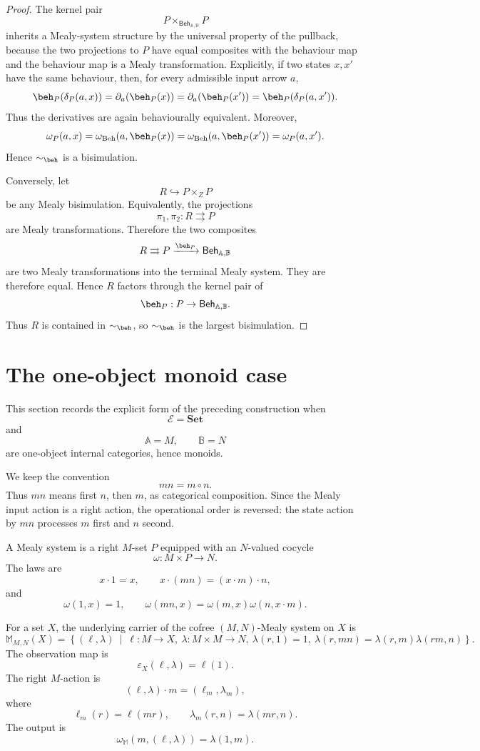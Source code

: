 \begin{proof}
The kernel pair
\[
P\times_{\mathsf{Beh}_{\mathbb A,\mathbb B}}P
\]
inherits a Mealy-system structure by the universal property of the pullback,
because the two projections to \(P\) have equal composites with the behaviour
map and the behaviour map is a Mealy transformation. Explicitly, if two
states \(x,x'\) have the same behaviour, then, for every admissible input
arrow \(a\),
\[
\beh_P(\delta_P(a,x))
=
\partial_a(\beh_P(x))
=
\partial_a(\beh_P(x'))
=
\beh_P(\delta_P(a,x')).
\]
Thus the derivatives are again behaviourally equivalent. Moreover,
\[
\omega_P(a,x)
=
\omega_{\mathrm{Beh}}(a,\beh_P(x))
=
\omega_{\mathrm{Beh}}(a,\beh_P(x'))
=
\omega_P(a,x').
\]
Hence \({\sim_{\beh}}\) is a bisimulation.

Conversely, let
\[
R\hookrightarrow P\times_ZP
\]
be any Mealy bisimulation. Equivalently, the projections
\[
\pi_1,\pi_2:R\rightrightarrows P
\]
are Mealy transformations. Therefore the two composites
\[
R\rightrightarrows P\xrightarrow{\beh_P}
\mathsf{Beh}_{\mathbb A,\mathbb B}
\]
are two Mealy transformations into the terminal Mealy system. They are
therefore equal. Hence \(R\) factors through the kernel pair of
\[
\beh_P:P\to\mathsf{Beh}_{\mathbb A,\mathbb B}.
\]
Thus \(R\) is contained in \({\sim_{\beh}}\), so \({\sim_{\beh}}\) is the
largest bisimulation.
\end{proof}

\section{The one-object monoid case}
\label{sec:one-object-monoid-case}

This section records the explicit form of the preceding construction when
\[
\mathcal E=\mathbf{Set}
\]
and
\[
\mathbb A=M,
\qquad
\mathbb B=N
\]
are one-object internal categories, hence monoids.

We keep the convention
\[
mn=m\circ n.
\]
Thus \(mn\) means first \(n\), then \(m\), as categorical composition. Since
the Mealy input action is a right action, the operational order is reversed:
the state action by \(mn\) processes \(m\) first and \(n\) second.

A Mealy system is a right \(M\)-set \(P\) equipped with an \(N\)-valued cocycle
\[
\omega:M\times P\to N.
\]
The laws are
\[
x\cdot 1=x,
\qquad
x\cdot(mn)=(x\cdot m)\cdot n,
\]
and
\[
\omega(1,x)=1,
\qquad
\omega(mn,x)=\omega(m,x)\omega(n,x\cdot m).
\]

\begin{proposition}
\label{prop:cofree-monoid-mealy}
For a set \(X\), the underlying carrier of the cofree \((M,N)\)-Mealy system
on \(X\) is
\[
\mathbb M_{M,N}(X)
=
\left\{
(\ell,\lambda)
\ \middle|\
\ell:M\to X,\
\lambda:M\times M\to N,\
\lambda(r,1)=1,\
\lambda(r,mn)=\lambda(r,m)\lambda(rm,n)
\right\}.
\]
The observation map is
\[
\varepsilon_X(\ell,\lambda)=\ell(1).
\]
The right \(M\)-action is
\[
(\ell,\lambda)\cdot m=(\ell_m,\lambda_m),
\]
where
\[
\ell_m(r)=\ell(mr),
\qquad
\lambda_m(r,n)=\lambda(mr,n).
\]
The output is
\[
\omega_{\mathbb M}(m,(\ell,\lambda))=\lambda(1,m).
\]
\end{proposition}

